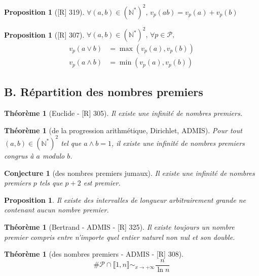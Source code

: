 \documentclass[10pt, a4paper, parskip=full, twoside, twocolumn]{report}
\newtheorem{theorem}[definition]{Théorème}
\newtheorem{proposition}[definition]{Proposition}
\newtheorem{conjecture}[definition]{Conjecture}
\newcommand{\IN}{\mathbb{N}}
\begin{document}
\begin{proposition}[\textnormal{[R] 319}]
	$\forall(a,b)\in\left(\IN^*\right)^2,\, v_p(ab) = v_p(a)+v_p(b)$
\end{proposition}

\begin{proposition}[\textnormal{[R] 307}]
	$\forall(a,b)\in\left(\IN^*\right)^2,\,\forall p\in\mathcal{P},$
	\begin{align*}
		v_p(a\vee b) &= \max (v_p(a),v_p(b)) \\
		v_p(a\wedge b) &= \min (v_p(a),v_p(b))
	\end{align*}
\end{proposition}

\subsection*{B. Répartition des nombres premiers}
\begin{theorem}[Euclide - \textnormal{[R] 305}]
	Il existe une infinité de nombres premiers.
\end{theorem}

\begin{theorem}[de la progression arithmétique, Dirichlet, ADMIS]
	Pour tout $(a,b)\in\left(\IN^*\right)^2$ tel que $a\wedge b = 1$, il existe une infinité de nombres premiers congrus à $a$ modulo $b$.
\end{theorem}

\begin{conjecture}[des nombres premiers jumaux]
	Il existe une infinité de nombres premiers $p$ tels que $p+2$ est premier.
\end{conjecture}

\begin{proposition}
	Il existe des intervalles de longueur arbitrairement grande ne contenant aucun nombre premier.
\end{proposition}

\begin{theorem}[Bertrand - ADMIS - \textnormal{[R] 325}]
	Il existe toujours un nombre premier compris entre n'importe quel entier naturel non nul et son double.
\end{theorem}

\begin{theorem}[des nombres premiers - ADMIS - \textnormal{[R] 308}]
	$$\#\mathcal{P}\cap \llbracket 1,n\rrbracket \sim_{x\to +\infty} \frac{n}{\ln n}$$
\end{theorem}
\end{document}
